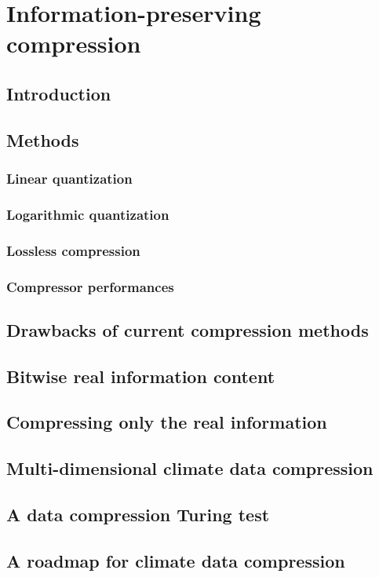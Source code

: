 \chapter{Information-preserving compression}
\label{chap:compression}

\section{Introduction}
\label{sec:compression_introduction}

\section{Methods}
\label{sec:compression_methods}

\subsection{Linear quantization}
\label{sec:linear_quantization}

\subsection{Logarithmic quantization}
\label{sec:log_quantization}

\subsection{Lossless compression}
\label{sec:lossless}

\subsection{Compressor performances}
\label{sec:compressor_performances}

\section{Drawbacks of current compression methods}
\section{Bitwise real information content}
\section{Compressing only the real information}
\section{Multi-dimensional climate data compression}
\section{A data compression Turing test}
\section{A roadmap for climate data compression}


